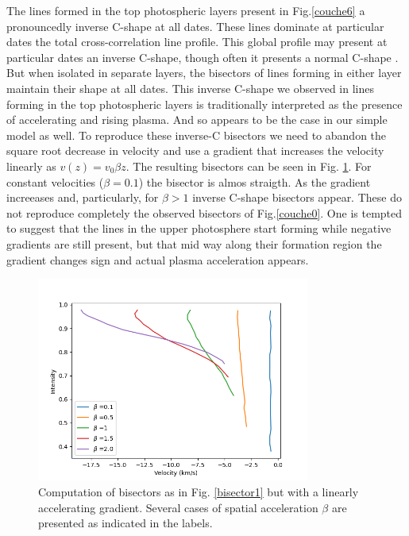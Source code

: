 \documentclass{/Users/art2/TeX/aanda/aa}
\begin{document}
The lines formed in the top photospheric layers present in Fig.\ref{couche6} a pronouncedly inverse C-shape at all dates. These lines  dominate at particular dates 
the total  cross-correlation line profile. This global profile  may present at particular dates an inverse C-shape,
though often it  presents a normal C-shape \citep{gray_mass_2008}. But when isolated in separate layers, the bisectors of lines forming in either layer 
maintain their shape at all dates. This inverse 
C-shape  we observed in lines forming in  the top photospheric layers is traditionally interpreted as the presence of accelerating and rising plasma. And so 
appears to be the case in our simple model  as well. To reproduce these inverse-C bisectors we need to abandon the square root decrease in velocity and 
use a gradient that increases  the velocity linearly as $v(z)=v_0\beta z$. The resulting bisectors can be seen in  Fig. \ref{bisector2}. For constant velocities 
($\beta=0.1$) the bisector is almos straigth. As the gradient increeases and, particularly, for $\beta >1$ inverse C-shape bisectors 
appear. These do not reproduce completely the observed bisectors of Fig.\ref{couche0}. One is tempted to suggest that the lines 
  in the upper photosphere start forming while negative gradients are still present, but that mid way along their formation region the gradient 
  changes sign and actual plasma acceleration appears. 


\begin{figure}
   \includegraphics[width=0.8\textwidth]{Fig10_art74.png}
   \caption{Computation of bisectors as in Fig. \ref{bisector1} but with a linearly accelerating gradient. Several cases of  spatial acceleration $\beta$ 
   are presented as indicated in the labels.}
   \label{bisector2}
   \end{figure}
\end{document}
